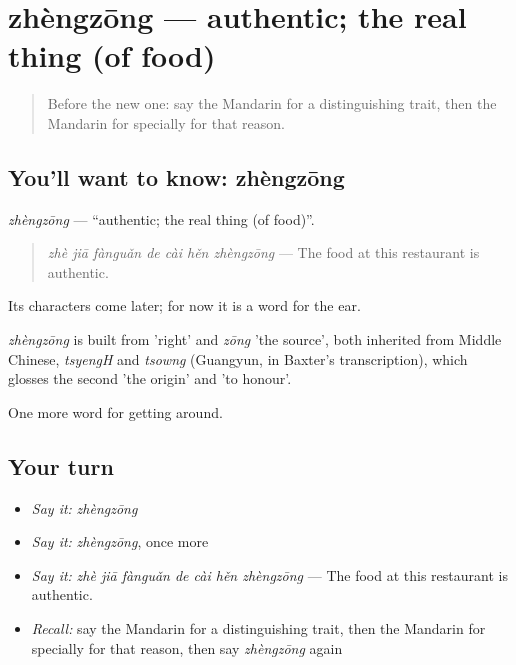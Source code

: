 \section[zhèngzōng]{zhèngzōng — authentic; the real thing (of food)}

\label{lesson:ZH-C450-zhengzong}



\begin{quote}
Before the new one: say the Mandarin for a distinguishing trait, then the Mandarin for specially for that reason.
\end{quote}

\subsection*{You'll want to know: zhèngzōng}
\emph{zhèngzōng} — \textquotedblleft{}authentic; the real thing (of food)\textquotedblright{}.

\begin{quote}
\emph{zhè jiā fànguǎn de cài hěn zhèngzōng} — The food at this restaurant is authentic.
\end{quote}

Its characters come later; for now it is a word for the ear.

\begin{cousinweb}
\emph{zhèngzōng} is built from  'right' and \emph{zōng} 'the source', both inherited from Middle Chinese, \emph{tsyengH} and \emph{tsowng} (Guangyun, in Baxter's transcription), which glosses the second 'the origin' and 'to honour'.
\end{cousinweb}

\begin{grammarlens}[title={What you've built}]
One more word for getting around.
\end{grammarlens}

\subsection*{Your turn}
\begin{itemize}
\raggedright
  \item \emph{Say it:} \emph{zhèngzōng}
  \item \emph{Say it:} \emph{zhèngzōng}, once more
  \item \emph{Say it:} \emph{zhè jiā fànguǎn de cài hěn zhèngzōng} — The food at this restaurant is authentic.
  \item \emph{Recall:} say the Mandarin for a distinguishing trait, then the Mandarin for specially for that reason, then say \emph{zhèngzōng} again
\end{itemize}

